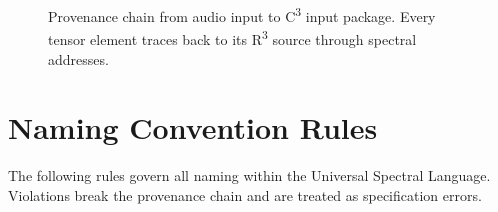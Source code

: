 \begin{figure}[ht]
\caption{Provenance chain from audio input to C\textsuperscript{3} input package.
         Every tensor element traces back to its R\textsuperscript{3} source
         through spectral addresses.}
\label{fig:provenance}
\end{figure}


\section{Naming Convention Rules}
\label{sec:naming-rules}

The following rules govern all naming within the Universal Spectral Language.
Violations break the provenance chain and are treated as specification errors.

